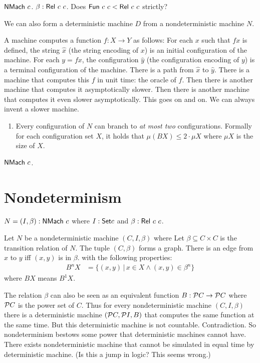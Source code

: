 $\mathsf{NMach}~c$.
$\beta : \mathsf{Rel}~c~c$.
Does $\mathsf{Fun}~c~c < \mathsf{Rel}~c~c$ strictly?

We can also form a deterministic machine $D$ from a nondeterministic machine $N$.

A machine computes a function $f : X \to Y$ as follows:
For each $x$ such that $f x$ is defined, the string $\hat x$ (the string encoding of $x$)
is an initial configuration of the machine.
For each $y = fx$, the configuration $\hat y$ (the configuration encoding of $y$)
is a terminal configuration of the machine.
There is a path from $\hat x$ to $\hat y$.
There is a machine that computes this $f$ in unit time: the oracle of $f$.
Then there is another machine that computes it asymptotically slower.
Then there is another machine that computes it even slower asymptotically.
This goes on and on.
We can always invent a slower machine.

\begin{enumerate}
    \item
        Every configuration of $N$ can branch to \emph{at most two} configurations.
        Formally for each configuration set $X$, it holds that $\mu(B X) \le 2 \cdot \mu X$
        where $\mu X$ is the size of $X$.
\end{enumerate}

$\mathsf{NMach}~c$.

\section{Nondeterminism}

$N = (I,\beta) : \mathsf{NMach}~c$
where $I : \textsf{Set}{c}$ and $\beta : \mathsf{Rel}~c~c$.

Let $N$ be a nondeterministic machine $(C,I,\beta)$ where
Let $\beta \subseteq C \times C$ is the transition relation of $N$.
The tuple $(C,\beta)$ forms a graph.
There is an edge from $x$ to $y$ iff $(x,y)$ is in $\beta$.
with the following properties:
\begin{align}
    B^n X &= \{ (x,y) \,|\, x \in X \wedge (x,y) \in \beta^n \}
\end{align}
where $B X$ means $B^1 X$.

The relation $\beta$ can also be seen as an equivalent function $B : \mathcal{P} C \to \mathcal{P} C$
where $\mathcal{P} C$ is the power set of $C$.
Thus for every nondeterministic machine $(C, I, \beta)$
there is a deterministic machine $(\mathcal{P} C, \mathcal{P} I, B)$
that computes the same function at the same time.
But this deterministic machine is not countable.
Contradiction.
So nondeterminism bestows some power that deterministic machines cannot have.
There exists nondeterministic machine that cannot be simulated in equal time by deterministic machine.
(Is this a jump in logic? This seems wrong.)

